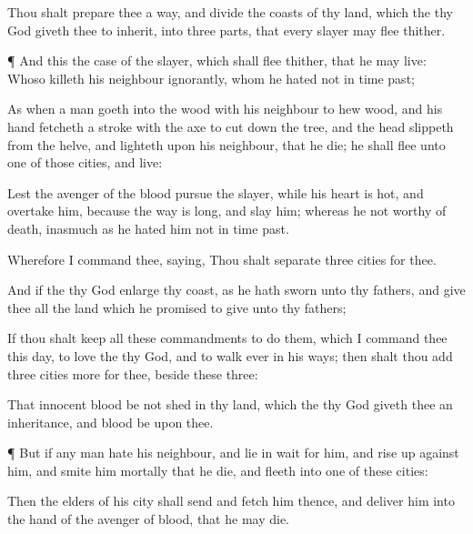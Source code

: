 {Thou shalt
prepare thee a
way, and divide the
coasts of thy
land, which the
{} thy
God giveth thee to
inherit, into three
parts, that every
slayer may
flee thither.


\par }{\PP {}¶ And this
{} the
case of the
slayer, which shall
flee thither, that he may
live: Whoso
killeth his
neighbour
ignorantly, whom he
hated not in
time
past;

As when a man
goeth into the
wood with his
neighbour to
hew
wood, and his
hand fetcheth a
stroke with the
axe to cut
down the
tree, and the
head
slippeth from the
helve, and
lighteth upon his
neighbour, that he
die; he shall
flee unto
one of those
cities, and
live:

Lest the
avenger of the
blood
pursue the
slayer,
while his
heart is
hot, and
overtake him, because the
way is
long, and
slay
him; whereas he
{} not
worthy of
death, inasmuch
as he
hated him not in
time
past.

Wherefore I
command thee,
saying, Thou shalt
separate
three
cities for thee.

And if the
{} thy
God
enlarge thy
coast, as he hath
sworn unto thy
fathers, and
give thee all the
land which he
promised to
give unto thy
fathers;

If thou shalt
keep all these
commandments to
do them, which I
command thee this
day, to
love the
{} thy
God, and to
walk
ever in his
ways; then shalt thou
add
three
cities more for thee, beside these
three:

That
innocent
blood be not
shed
in thy
land, which the
{} thy
God
giveth thee
{} an
inheritance, and
{}
blood be upon thee.


\par }{\PP {}¶ But if any
man
hate his
neighbour, and lie in
wait for him, and rise
up against him, and
smite him
mortally that he
die, and
fleeth into
one of
these
cities:

Then the
elders of his
city shall
send and
fetch him thence, and
deliver him into the
hand of the
avenger of
blood, that he may
die.

}
